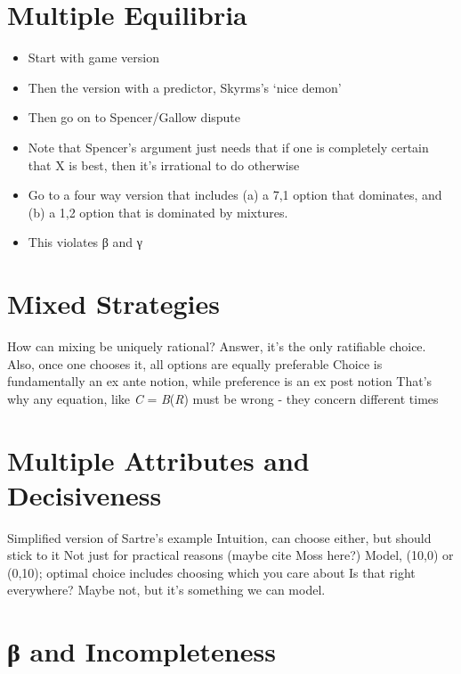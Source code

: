 \documentclass[
  11pt,
  letterpaper,
  DIV=11,
  numbers=noendperiod,
  twoside]{scrartcl}
\providecommand{\tightlist}{%
  \setlength{\itemsep}{0pt}\setlength{\parskip}{0pt}}
\begin{document}
\section{Multiple Equilibria}\label{sec-multieq}

\begin{itemize}
\tightlist
\item
  Start with game version
\item
  Then the version with a predictor, Skyrms's `nice demon'
\item
  Then go on to Spencer/Gallow dispute
\item
  Note that Spencer's argument just needs that if one is completely
  certain that X is best, then it's irrational to do otherwise
\item
  Go to a four way version that includes (a) a 7,1 option that
  dominates, and (b) a 1,2 option that is dominated by mixtures.
\item
  This violates β and γ
\end{itemize}

\section{Mixed Strategies}\label{sec-mixed}

How can mixing be uniquely rational? Answer, it's the only ratifiable
choice. Also, once one chooses it, all options are equally preferable
Choice is fundamentally an ex ante notion, while preference is an ex
post notion That's why any equation, like \emph{C} = \emph{B}(\emph{R})
must be wrong - they concern different times

\section{Multiple Attributes and Decisiveness}\label{sec-sartre}

Simplified version of Sartre's example Intuition, can choose either, but
should stick to it Not just for practical reasons (maybe cite Moss
here?) Model, (10,0) or (0,10); optimal choice includes choosing which
you care about Is that right everywhere? Maybe not, but it's something
we can model.

\section{β and Incompleteness}\label{sec-dorr}
\end{document}
